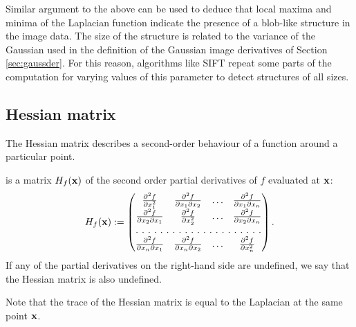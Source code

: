 Similar argument to the above can be used to deduce that local maxima and minima of the Laplacian function indicate the presence of a blob-like structure in the image data. 
The size of the structure is related to the variance of the Gaussian used in the definition of the Gaussian image derivatives of Section \ref{sec:gaussder}. 
For this reason, algorithms like SIFT \cite{lowe1999} repeat some parts of the computation for varying values of this parameter to detect structures of all sizes. 

\subsection{Hessian matrix}

The Hessian matrix describes a second-order behaviour of a function around a particular point. 

\begin{definition} 
 is a matrix $H_f(\mathbf{x})$ of the second order partial derivatives of $f$ evaluated at $\mathbf{x}$: %
\begin{align*} 
H_f(\x) := 
\begin{pmatrix} 
\fpp{ \partial x_1^2 }              &   \fpp{ \partial x_1 \partial x_2 }   &   \ldots   &   \fpp{ \partial x_1 \partial x_n }   \\ 
\fpp{ \partial x_2 \partial x_1 }   &   \fpp{ \partial x_2^2 }              &   \ldots   &   \fpp{ \partial x_2 \partial x_n }   \\ 
\hdotsfor[2]{4} \\ 
\fpp{ \partial x_n \partial x_1 }   &   \fpp{ \partial x_n \partial x_2 }   &   \ldots   &   \fpp{ \partial x_n^2 }  
\end{pmatrix}. 
\end{align*} 
If any of the partial derivatives on the right-hand side are undefined, we say that the Hessian matrix is also undefined.
% 
\end{definition} 
Note that the trace of the Hessian matrix is equal to the Laplacian at the same point $\mathbf{x}$. 

